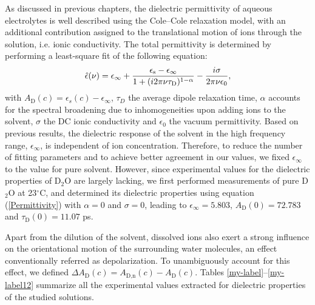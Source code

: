 As discussed in previous chapters, the dielectric permittivity of aqueous electrolytes is well described using the Cole--Cole relaxation model, with an additional contribution assigned to the translational motion of ions through the solution, i.e. ionic conductivity. The total permittivity is determined by performing a least-square fit of the following equation: 
\begin{eqnarray}
\hat{\epsilon}(\nu) = \epsilon_{\infty} + \frac{\epsilon_{\rm s} - \epsilon_{\infty}}{1 + (i 2 \pi \nu \tau_{\rm D})^{1-\alpha}} - \frac{i \sigma}{2 \pi \nu \epsilon_0}, \nonumber
\label{Permittivity}
\end{eqnarray}
with $A_\text{D} (c) = \epsilon_s (c) - \epsilon_\infty$, $\tau_D$ the average dipole relaxation time, $\alpha$ accounts for the spectral broadening due to inhomogeneities upon adding ions to the solvent, $\sigma$ the DC ionic conductivity and $\epsilon_0$ the vacuum permittivity. Based on previous results,\!\cite{Lileev2007} the dielectric response of the solvent in the high frequency range, $\epsilon_\infty$, is independent of ion concentration. Therefore, to reduce the number of fitting parameters and to achieve better agreement in our values, we fixed $\epsilon_\infty$ to the value for pure solvent. However, since experimental values for the dielectric properties of D$_2$O are largely lacking, we first performed measurements of pure D$_2$O at 23$^\circ$C, and determined its dielectric properties using equation (\ref{Permittivity}) with $\alpha = 0$ and $\sigma = 0$, leading to $\epsilon_\infty = 5.803$, $A_\text{D} (0) = 72.783$ and $\tau_\text{D} (0) = 11.07$ ps.

Apart from the dilution of the solvent, dissolved ions also exert a strong influence on the orientational motion of the surrounding water molecules, an effect conventionally referred as depolarization. To unambiguously account for this effect, we defined $\Delta A_\text{D} (c) = A_\text{D,n} (c) - A_\text{D} (c)$. Tables \ref{my-label}--\ref{my-label12} summarize all the experimental values extracted for dielectric properties of the studied solutions.




